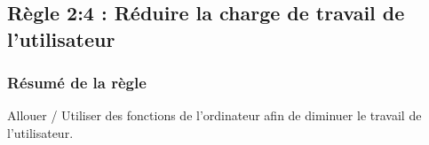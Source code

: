 \documentclass{article}[12pt]
\begin{document}
   \subsection{Règle 2:4 : Réduire la charge de travail de l'utilisateur}
      \label{work-load}

     
    \subsubsection*{Résumé de la règle}
    Allouer / Utiliser des fonctions de l'ordinateur afin de diminuer le travail de l'utilisateur.
\end{document}
